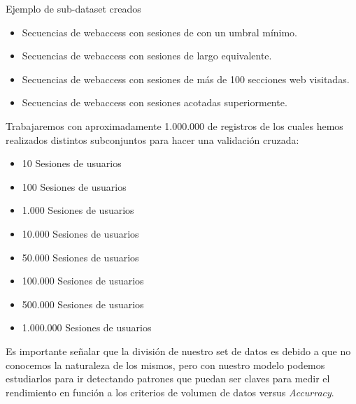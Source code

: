 Ejemplo de sub-dataset creados
\begin{itemize}
	\setlength{\itemsep}{1pt}
	\setlength{\parskip}{0pt}
	\setlength{\parsep}{0pt}
	\item Secuencias de webaccess con sesiones de con un umbral mínimo.
	\item Secuencias de webaccess con sesiones de largo equivalente.
	\item Secuencias de webaccess con sesiones de más de 100 secciones web visitadas.
	\item Secuencias de webaccess con sesiones acotadas superiormente.
\end{itemize}


Trabajaremos con aproximadamente 1.000.000 de registros de los cuales hemos realizados distintos subconjuntos para hacer una validación cruzada:

\begin{itemize}
	\setlength{\itemsep}{1pt}
	\setlength{\parskip}{0pt}
	\setlength{\parsep}{0pt}
	\item 10 Sesiones de usuarios
	\item 100 Sesiones de usuarios
	\item 1.000 Sesiones de usuarios
	\item 10.000 Sesiones de usuarios
	\item 50.000 Sesiones de usuarios
	\item 100.000 Sesiones de usuarios
	\item 500.000 Sesiones de usuarios
	\item 1.000.000 Sesiones de usuarios
\end{itemize}


Es importante señalar que la división de nuestro set de datos es debido a que no conocemos la naturaleza de los mismos, pero con nuestro modelo podemos estudiarlos para ir detectando patrones que puedan ser claves para medir el rendimiento en función a los criterios de volumen de datos versus \emph{Accurracy}.






